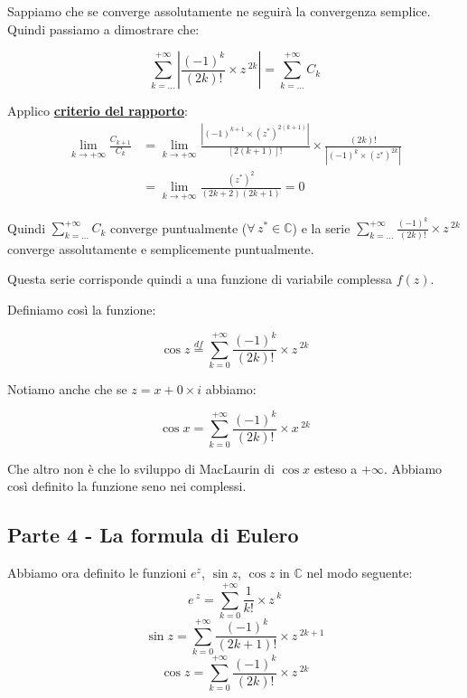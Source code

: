 \documentclass[../dimostrazioni]{subfiles}
\begin{document}
                Sappiamo che se converge assolutamente ne seguirà la convergenza semplice. Quindi passiamo a dimostrare che:

                \[  \sum_{k=\dots}^{+\infty} \left| \frac{(-1)^k}{(2k)!} \times z\,^{2k} \right| = \sum_{k=\dots}^{+\infty} C_k \]

                Applico \textbf{\hyperref[criterioRapportoSerie]{criterio del rapporto}}:
                \begin{align*}
                    \lim_{k \to +\infty} \frac{C_{k+1}}{C_k} &= \lim_{k \to +\infty} \frac{\left| (-1)^{k+1} \times (z^*)^{2(k+1)}\right|}{\left[2(k+1)\right]!} \times \frac{\left(2k\right)!}{\left| (-1)^k \times (z^*)^{2k}\right|} \\
                    &= \lim_{k \to +\infty} \frac{(z^*)^2}{(2k+2)(2k+1)} = 0
                \end{align*}

                Quindi \(\sum_{k=\dots}^{+\infty} C_k\) converge puntualmente (\(\forall \, z^* \in \mathbb{C}\)) 
                e la serie  \(\sum_{k=\dots}^{+\infty} \frac{(-1)^k}{(2k)!} \times z\,^{2k}\) converge assolutamente e semplicemente puntualmente.

                Questa serie corrisponde quindi a una funzione di variabile complessa \(f(z)\).

                Definiamo così la funzione:

                \[  \cos z \stackrel{df}{=} \sum_{k=0}^{+\infty} \frac{(-1)^k}{(2k)!} \times z\,^{2k}    \]

                Notiamo anche che se \(z = x + 0 \times i\) abbiamo:

                \[  \cos x = \sum_{k=0}^{+\infty} \frac{(-1)^k}{(2k)!} \times x\,^{2k} \]

                Che altro non è che lo sviluppo di MacLaurin di \(\cos x\) esteso a \(+\infty\). 
                Abbiamo così definito la funzione seno nei complessi.

            \subsection*{Parte 4 - \textbf{La formula di Eulero}}

                Abbiamo ora definito le funzioni \(e^z\), \(\sin z\), \(\cos z\) in \(\mathbb{C}\) nel modo seguente:
                \[  e\,^z  =  \sum_{k=0}^{+\infty} \frac{1}{k!} \times z\,^k    \]
                \[  \sin z = \sum_{k=0}^{+\infty} \frac{(-1)^k}{(2k+1)!} \times z\,^{2k+1} \]
                \[  \cos z = \sum_{k=0}^{+\infty} \frac{(-1)^k}{(2k)!} \times z\,^{2k}    \]
\end{document}
